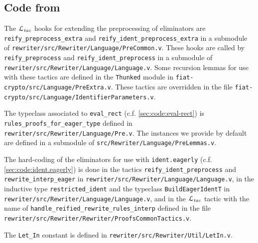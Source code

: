 \documentclass[a4paper,USenglish,cleveref,autoref,thm-restate]{lipics-v2021}
\newcommand{\Ltac}{\ensuremath{\mathcal{L}_\text{\emph{tac}}}}
\begin{document}
\subsection{Code from }\label{sec:code-from-implementation-and-usage}

The \Ltac{} hooks for extending the preprocessing of eliminators are \texttt{reify_preprocess_extra} and \texttt{reify_ident_preprocess_extra} in a submodule of \texttt{rewriter/src/Rewriter/Language/PreCommon.v}.
These hooks are called by \texttt{reify_preprocess} and \texttt{reify_ident_preprocess} in a submodule of \texttt{rewriter/src/Rewriter/Language/Language.v}.
Some recursion lemmas for use with these tactics are defined in the \verb|Thunked| module in \texttt{fiat-crypto/src/Language/PreExtra.v}.
These tactics are overridden in the file \texttt{fiat-crypto/src/Language/IdentifierParameters.v}.

The typeclass associated to \texttt{eval_rect} ({c.f.} \autoref{sec:code:eval-rect}) is \texttt{rules_proofs_for_eager_type} defined in \texttt{rewriter/src/Rewriter/Language/Pre.v}.
The instances we provide by default are defined in a submodule of \texttt{src/Rewriter/Language/PreLemmas.v}.

The hard-coding of the eliminators for use with \texttt{ident.eagerly} ({c.f.} \autoref{sec:code:ident.eagerly}) is done in the tactics \texttt{reify_ident_preprocess} and \texttt{rewrite_interp_eager} in \texttt{rewriter/src/Rewriter/Language/Language.v}, in the inductive type \texttt{restricted_ident} and the typeclass \texttt{BuildEagerIdentT} in \texttt{rewriter/src/Rewriter/Language/Language.v}, and in the \Ltac{} tactic with the name of \texttt{handle_reified_rewrite_rules_interp} defined in the file \texttt{rewriter/src/Rewriter/Rewriter/ProofsCommonTactics.v}.

The \texttt{Let_In} constant is defined in \texttt{rewriter/src/Rewriter/Util/LetIn.v}.
\end{document}
